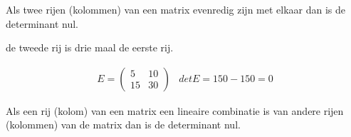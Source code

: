 \begin{eigenschap}
		Als twee rijen (kolommen) van een matrix evenredig zijn met elkaar dan is de determinant nul. 
	\end{eigenschap}
	
	\begin{voorbeeld}
		de tweede rij is drie maal de eerste rij.
	
	\[ \begin{array}{ll} E=\left( \begin{matrix}
	5 & 10 \\ 15 & 30 
	\end{matrix} \right) & det E=150-150=0 \end{array} \]
	
	\end{voorbeeld}
\begin{eigenschap}
		Als een rij (kolom) van een matrix een lineaire combinatie is van andere rijen (kolommen) van de matrix dan is de determinant nul.
	\end{eigenschap}
	
